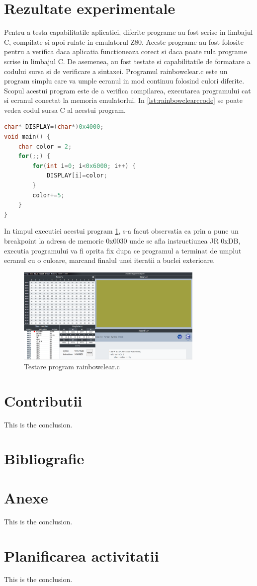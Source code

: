 \documentclass[titlepage,12pt]{article}
\DeclareRobustCommand{\code}[1]{{\ttfamily\small #1}}
\begin{document}
\section{Rezultate experimentale}
Pentru a testa capabilitatile aplicatiei, diferite programe au fost scrise in limbajul C, compilate si apoi rulate in emulatorul Z80. Aceste programe au fost folosite pentru a verifica daca aplicatia functioneaza corect si daca poate rula programe scrise in limbajul C. De asemenea, au fost testate si capabilitatile de formatare a codului sursa si de verificare a sintaxei.
Programul \code{rainbowclear.c} este un program simplu care va umple ecranul in mod continuu folosind culori diferite. Scopul acestui program este de a verifica compilarea, executarea programului cat si ecranul conectat la memoria emulatorlui. In \cref{lst:rainbowclearccode} se poate vedea codul sursa C al acestui program.

\begin{lstlisting}[language=C,caption={Cod sursa C pentru \code{rainbowclear.c}},label={lst:rainbowclearccode}]
char* DISPLAY=(char*)0x4000;
void main() {
    char color = 2;
    for(;;) {
        for(int i=0; i<0x6000; i++) {
            DISPLAY[i]=color;
        }
        color+=5;
    }
}
\end{lstlisting}

In timpul executiei acestui program \cref{fig:rainbowtestrun}, s-a facut observatia ca prin a pune un breakpoint la adresa de memorie \code{0x0030} unde se afla instructiunea \code{JR 0xDB}, executia programului va fi oprita fix dupa ce programul a terminat de umplut ecranul cu o culoare, marcand finalul unei iteratii a buclei exterioare.

\begin{figure}[H]
    \centering
    \includegraphics[width=0.8\textwidth]{images/rainbowtestrun.png}
    \caption{Testare program \code{rainbowclear.c}}
    \label{fig:rainbowtestrun}
\end{figure}

\section{Contributii}
This is the conclusion.

\section{Bibliografie}
\printbibliography
\clearpage

\section{Anexe}
This is the conclusion.

\section{Planificarea activitatii}
This is the conclusion.
\end{document}
